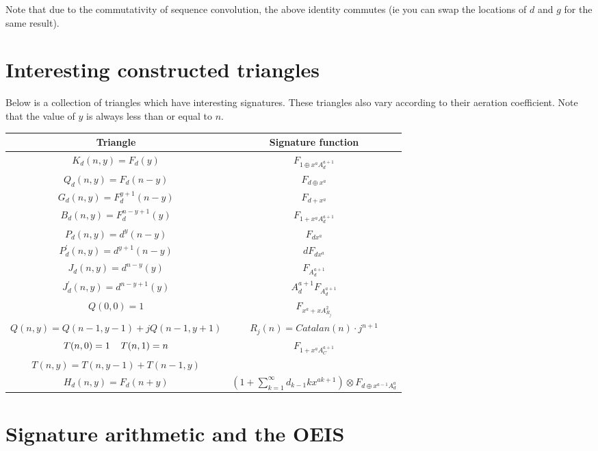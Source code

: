 \documentclass{article}
\begin{document}
\noindent Note that due to the commutativity of sequence convolution, the above identity commutes (ie you can swap the locations of $d$ and $g$ for the same result).

\pagebreak

\section{Interesting constructed triangles}

Below is a collection of triangles which have interesting signatures. These triangles also vary according to their aeration coefficient. Note that the value of $y$ is always less than or equal to $n$.

\begin{center}
\begin{tabular}{|c|c|}
\hline
Triangle & Signature function\\
\hline
$K_d (n, y) = F_d(y)$  & $F_{1 \oplus x^a A_d^{a+1}}$\\
\hline
$Q_d (n, y) = F_d(n-y)$ & $F_{d \oplus x^a}$\\
\hline
$G_d(n, y) = F_d^{y+1} (n-y)$ & $F_{d + x^{a}}$\\
\hline
$B_d(n, y) = F_d^{n-y+1}(y)$ & $F_{1 + x^{a}A_d^{a+1}}$\\
\hline
$P_d(n, y) = d^y(n-y)$ & $F_{dx^a}$\\
\hline
$P_d^{\prime}(n, y) = d^{y+1}(n-y)$ & $dF_{d x^a}$\\
\hline
$J_d(n, y) = d^{n-y}(y)$ & $F_{A_d^{a+1}}$\\
\hline
$J_d^{\prime}(n, y) = d^{n-y+1}(y)$ & $A_d^{a+1} F_{A_d^{a+1}}$\\
\hline
$Q(0, 0) = 1$ & $F_{x^a + xA_{R_j}^2}$\\
$Q(n, y) = Q(n-1, y-1) + jQ(n-1, y+1)$ & $R_j(n) = Catalan(n) \cdot j^{n+1}$\\
\hline
$T(n, 0) = 1 \hspace{4mm} T(n, 1) = n$ & $F_{1 + x^a A_C^{a+1}}$\\
$T(n, y) = T(n,y-1) + T(n-1, y)$ &\\
\hline
$H_d (n, y) = F_d(n+y)$ & $\left(1 + \sum_{k=1}^{\infty} d_{k-1} k x^{ak+1} \right) \otimes F_{d \oplus x^{a-1}A_d^{a}}$\\
\hline
\end{tabular}
\end{center}

\pagebreak

\section{Signature arithmetic and the OEIS}
\end{document}
